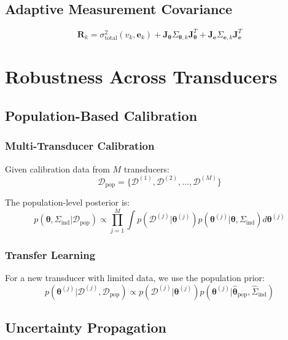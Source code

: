 \documentclass[11pt]{article}
\begin{document}
\subsection{Adaptive Measurement Covariance}

\begin{equation}
\mathbf{R}_k = \sigma_{\text{total}}^2(v_k, \mathbf{e}_k) + \mathbf{J}_{\bm{\theta}} \Sigma_{\bm{\theta},k} \mathbf{J}_{\bm{\theta}}^T + \mathbf{J}_{\mathbf{e}} \Sigma_{\mathbf{e},k} \mathbf{J}_{\mathbf{e}}^T
\end{equation}

\section{Robustness Across Transducers}

\subsection{Population-Based Calibration}

\subsubsection{Multi-Transducer Calibration}
Given calibration data from $M$ transducers:
\begin{equation}
\mathcal{D}_{\text{pop}} = \{\mathcal{D}^{(1)}, \mathcal{D}^{(2)}, \ldots, \mathcal{D}^{(M)}\}
\end{equation}

The population-level posterior is:
\begin{equation}
p(\bm{\theta}, \Sigma_{\text{ind}} | \mathcal{D}_{\text{pop}}) \propto \prod_{j=1}^M \int p(\mathcal{D}^{(j)} | \bm{\theta}^{(j)}) p(\bm{\theta}^{(j)} | \bm{\theta}, \Sigma_{\text{ind}}) d\bm{\theta}^{(j)}
\end{equation}

\subsubsection{Transfer Learning}
For a new transducer with limited data, we use the population prior:
\begin{equation}
p(\bm{\theta}^{(j)} | \mathcal{D}^{(j)}, \mathcal{D}_{\text{pop}}) \propto p(\mathcal{D}^{(j)} | \bm{\theta}^{(j)}) p(\bm{\theta}^{(j)} | \hat{\bm{\theta}}_{\text{pop}}, \hat{\Sigma}_{\text{ind}})
\end{equation}

\subsection{Uncertainty Propagation}
\end{document}
